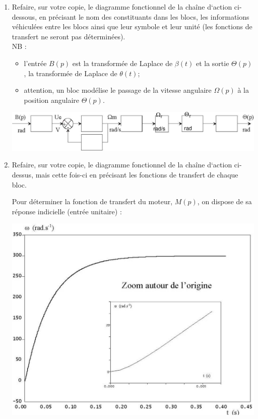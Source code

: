 \begin{enumerate}

\item Refaire, sur votre copie, le diagramme fonctionnel de la chaîne d‘action
ci-dessous, en précisant le nom des constituants dans les blocs, les
informations véhiculées entre les blocs ainsi que leur symbole et leur unité
(les fonctions de transfert ne seront pas déterminées).\\
NB : 
\begin{itemize}
 \item l’entrée $B(p)$ est la transformée de Laplace de $\beta(t)$ et la sortie
$\Theta(p)$, la transformée de Laplace de $\theta(t)$;
\item attention, un bloc modélise le passage de la vitesse angulaire $\Omega(p)$
à la position angulaire $\Theta(p)$.
\end{itemize}

\begin{center}
 \includegraphics[width=.6\textwidth]{png/image4}
\end{center}

\item Refaire, sur votre copie, le diagramme fonctionnel de la chaîne d‘action
ci-dessus, mais cette fois-ci en précisant les fonctions de transfert de chaque\\
bloc.

Pour déterminer la fonction de transfert du moteur, $M(p)$, on dispose de sa
réponse indicielle (entrée unitaire) :

\begin{center}
 \includegraphics[width=.6\textwidth]{png/image5}
\end{center}



\end{enumerate}

